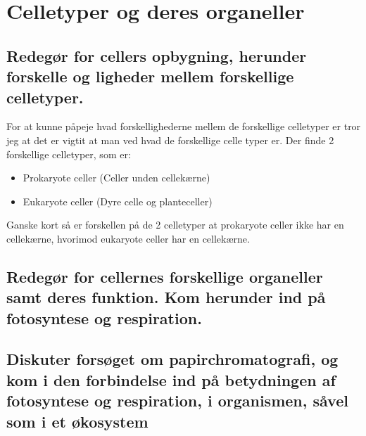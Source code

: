 \newpage
\section{Celletyper og deres organeller}\label{sec:celletyperogderesorganeller}
    \subsection{Redegør for cellers opbygning, herunder forskelle og ligheder mellem forskellige celletyper.}
        For at kunne påpeje hvad forskellighederne mellem de forskellige celletyper er tror jeg at det er vigtit at man ved hvad de forskellige celle typer er. 
        Der finde 2 forskellige celletyper, som er:
        \begin{itemize}
            \item Prokaryote celler (Celler unden cellekærne)
            \item Eukaryote celler (Dyre celle og planteceller)
        \end{itemize}
        Ganske kort så er forskellen på de 2 celletyper at prokaryote celler ikke har en cellekærne, hvorimod eukaryote celler har en cellekærne.
        

    \subsection{Redegør for cellernes forskellige organeller samt deres funktion. Kom herunder ind på fotosyntese og respiration.}

    \subsection{Diskuter forsøget om papirchromatografi, og kom i den forbindelse ind på betydningen af fotosyntese og respiration, i organismen, såvel som i et økosystem}

